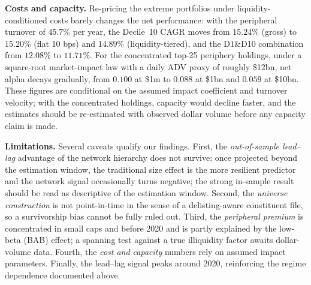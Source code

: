 \documentclass[fleqn]{rbfin}
\begin{document}
\noindent\textbf{Costs and capacity.} Re-pricing the extreme portfolios under liquidity-conditioned costs barely changes the net performance: with the peripheral turnover of $45.7\%$ per year, the Decile~10 CAGR moves from $15.24\%$ (gross) to $15.20\%$ (flat 10 bps) and $14.89\%$ (liquidity-tiered), and the D1\&D10 combination from $12.08\%$ to $11.71\%$. For the concentrated top-25 periphery holdings, under a square-root market-impact law with a daily ADV proxy of roughly \$12bn, net alpha decays gradually, from $0.100$ at \$1m to $0.088$ at \$1bn and $0.059$ at \$10bn. These figures are conditional on the assumed impact coefficient and turnover velocity; with the concentrated holdings, capacity would decline faster, and the estimates should be re-estimated with observed dollar volume before any capacity claim is made.

\noindent\textbf{Limitations.} Several caveats qualify our findings. First, the \emph{out-of-sample lead--lag} advantage of the network hierarchy does not survive: once projected beyond the estimation window, the traditional size effect is the more resilient predictor and the network signal occasionally turns negative; the strong in-sample result should be read as descriptive of the estimation window. Second, the \emph{universe construction} is not point-in-time in the sense of a delisting-aware constituent file, so a survivorship bias cannot be fully ruled out. Third, the \emph{peripheral premium} is concentrated in small caps and before 2020 and is partly explained by the low-beta (BAB) effect; a spanning test against a true illiquidity factor \citep{amihud2002illiquidity} awaits dollar-volume data. Fourth, the \emph{cost and capacity} numbers rely on assumed impact parameters. Finally, the lead--lag signal peaks around 2020, reinforcing the regime dependence documented above.
\end{document}
